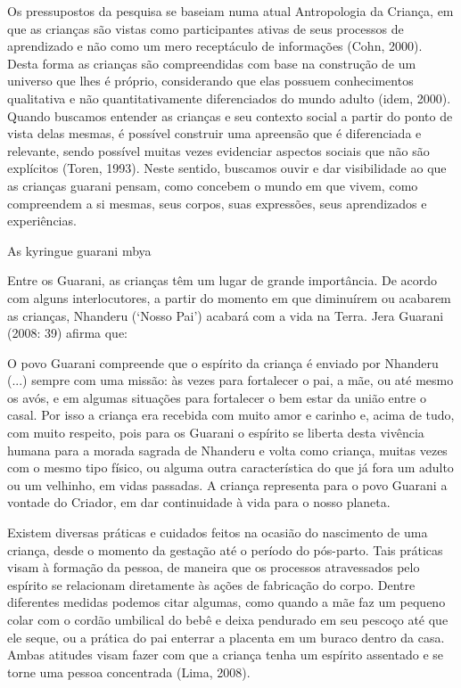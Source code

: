 \documentclass{article}
\begin{document}
Os pressupostos da pesquisa se baseiam numa atual Antropologia da
Crian\c{c}a, em que as crian\c{c}as s\~ao vistas como participantes
ativas de seus processos de aprendizado e n\~ao como um mero
recept\'aculo de informa\c{c}\~oes (Cohn, 2000). Desta forma as
crian\c{c}as s\~ao compreendidas com base na constru\c{c}\~ao de um
universo que lhes \'e pr\'oprio, considerando que elas possuem
conhecimentos qualitativa e n\~ao quantitativamente diferenciados do
mundo adulto (idem, 2000). Quando buscamos entender as crian\c{c}as e
seu contexto social a partir do ponto de vista delas mesmas, \'e
poss\'ivel construir uma apreens\~ao que \'e diferenciada e relevante,
sendo poss\'ivel muitas vezes evidenciar aspectos sociais que n\~ao
s\~ao expl\'icitos (Toren, 1993). Neste sentido, buscamos ouvir e dar
visibilidade ao que as crian\c{c}as guarani pensam, como concebem o
mundo em que vivem, como compreendem a si mesmas, seus corpos, suas
express\~oes, seus aprendizados e experi\^encias. 

As kyringue guarani mbya

Entre os Guarani, as crian\c{c}as t\^em um lugar de grande
import\^ancia. De acordo com alguns interlocutores, a partir do momento
em que diminu\'irem ou acabarem as crian\c{c}as, Nhanderu
({\textquoteleft}Nosso Pai{\textquoteright}) acabar\'a com a vida na
Terra. Jera Guarani (2008: 39) afirma que:

O povo Guarani compreende que o esp\'irito da crian\c{c}a \'e enviado
por Nhanderu (...) sempre com uma miss\~ao: \`as vezes para fortalecer
o pai, a m\~ae, ou at\'e mesmo os av\'os, e em algumas situa\c{c}\~oes
para fortalecer o bem estar da uni\~ao entre o casal. Por isso a
crian\c{c}a era recebida com muito amor e carinho e, acima de tudo, com
muito respeito, pois para os Guarani o esp\'irito se liberta desta
viv\^encia humana para a morada sagrada de Nhanderu e volta como
crian\c{c}a, muitas vezes com o mesmo tipo f\'isico, ou alguma outra
caracter\'istica do que j\'a fora um adulto ou um velhinho, em vidas
passadas. A crian\c{c}a representa para o povo Guarani a vontade do
Criador, em dar continuidade \`a vida para o nosso planeta.

Existem diversas pr\'aticas e cuidados feitos na ocasi\~ao do nascimento
de uma crian\c{c}a, desde o momento da gesta\c{c}\~ao at\'e o per\'iodo
do p\'os-parto. Tais pr\'aticas visam \`a forma\c{c}\~ao da pessoa, de
maneira que os processos atravessados pelo esp\'irito se relacionam
diretamente \`as a\c{c}\~oes de fabrica\c{c}\~ao do corpo. Dentre
diferentes medidas podemos citar algumas, como quando a m\~ae faz um
pequeno colar com o cord\~ao umbilical do beb\^e e deixa pendurado em
seu pesco\c{c}o at\'e que ele seque, ou a pr\'atica do pai enterrar a
placenta em um buraco dentro da casa. Ambas atitudes visam fazer com
que a crian\c{c}a tenha um esp\'irito assentado e se torne uma pessoa
concentrada (Lima, 2008).
\end{document}
